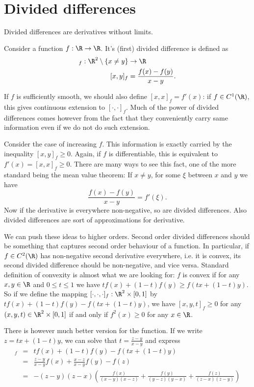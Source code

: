\chapter{Divided differences}

Divided differences are derivatives without limits.

Consider a function $f : \R \to \R$. It's (first) divided difference is defined as
\begin{align*}
	[\cdot , \cdot]_{f} : \R^{2} \setminus \{x \neq y\} &\to \R \\
	[x, y]_{f} &= \frac{f(x) - f(y)}{x - y}.
\end{align*}

If $f$ is sufficiently smooth, we should also define $[x, x]_{f} = f'(x)$: if $f \in C^{1}(\R)$, this gives continuous extension to $[\cdot, \cdot]_{f}$. Much of the power of divided differences comes however from the fact that they conveniently carry same information even if we do not do such extension.

Consider the case of increasing $f$. This information is exactly carried by the inequality $[x, y]_{f} \geq 0$. Again, if $f$ is differentiable, this is equivalent to $f'(x) = [x, x]_{f} \geq 0$. There are many ways to see this fact, one of the more standard being the mean value theorem: If $x \neq y$, for some $\xi$ between $x$ and $y$ we have
\[
	\frac{f(x) - f(y)}{x - y} = f'(\xi).
\]
Now if the derivative is everywhere non-negative, so are divided differences. Also divided differences are sort of approximations for derivative.

We can push these ideas to higher orders. Second order divided differences should be something that captures second order behaviour of a function. In particular, if $f \in C^{2}(\R)$ has non-negative second derivative everywhere, i.e. it is convex, its second divided difference should be non-negative, and vice versa. Standard definition of convexity is almost what we are looking for: $f$ is convex if for any $x, y \in \R$ and $0 \leq t \leq 1$ we have $t f(x) + (1 - t) f(y) \geq f(t x + (1 - t)y)$. So if we define the mapping $[\cdot, \cdot, \cdot]_{f} : \R^{2} \times [0, 1]$ by $t f(x) + (1 - t) f(y) - f(t x + (1 - t)y)$, we have $[x, y, t]_{f} \geq 0$ for any $(x, y, t) \in \R^{2} \times [0, 1]$ if and only if $f^{2}(x) \geq 0$ for any $x \in \R$.

There is however much better version for the function. If we write $z = t x + (1 - t) y$, we can solve that $t = \frac{z - y}{x - y}$ and express
\begin{eqnarray*}
	[x, y, t]_{f} &=& t f(x) + (1 - t) f(y) - f(t x + (1 - t)y) \\
	&=& \frac{z - y}{x - y} f(x) + \frac{x - z}{x - y} f(y) - f(z) \\
	&=& -(z - y)(z - x) \left(\frac{f(x)}{(x - y)(x - z)} + \frac{f(y)}{(y - z)(y - x)} + \frac{f(z)}{(z - x)(z - y)} \right)
\end{eqnarray*}


